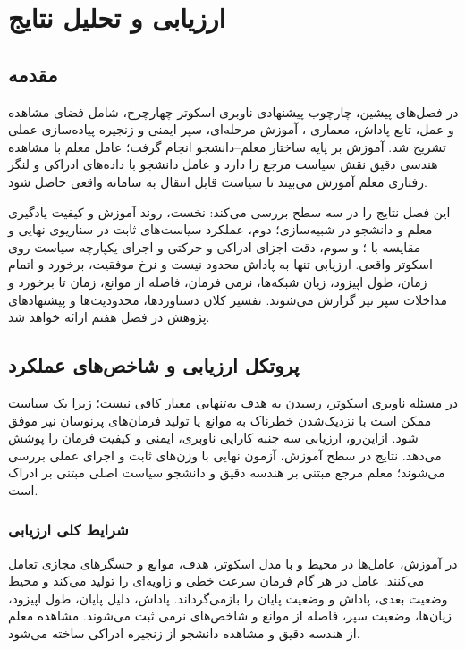 \chapter{ارزیابی و تحلیل نتایج}

\section{مقدمه}
\label{sec:evaluation_intro}

در فصل‌های پیشین، چارچوب پیشنهادی ناوبری اسکوتر چهارچرخ، شامل فضای مشاهده و عمل، تابع پاداش، معماری ، آموزش مرحله‌ای، سپر ایمنی و زنجیره پیاده‌سازی عملی تشریح شد. آموزش بر پایه ساختار معلم--دانشجو انجام گرفت؛ عامل معلم با مشاهده هندسی دقیق نقش سیاست مرجع را دارد و عامل دانشجو با داده‌های ادراکی و لنگر رفتاری معلم آموزش می‌بیند تا سیاست قابل انتقال به سامانه واقعی حاصل شود.

این فصل نتایج را در سه سطح بررسی می‌کند: نخست، روند آموزش و کیفیت یادگیری معلم و دانشجو در شبیه‌سازی؛ دوم، عملکرد سیاست‌های ثابت در سناریوی نهایی و مقایسه با ؛ و سوم، دقت اجزای ادراکی و حرکتی و اجرای یکپارچه سیاست روی اسکوتر واقعی. ارزیابی تنها به پاداش محدود نیست و نرخ موفقیت، برخورد و اتمام زمان، طول اپیزود، زیان شبکه‌ها، نرمی فرمان، فاصله از موانع، زمان تا برخورد و مداخلات سپر نیز گزارش می‌شوند. تفسیر کلان دستاوردها، محدودیت‌ها و پیشنهادهای پژوهش در فصل هفتم ارائه خواهد شد.

\section{پروتکل ارزیابی و شاخص‌های عملکرد}
\label{sec:evaluation_protocol}

در مسئله ناوبری اسکوتر، رسیدن به هدف به‌تنهایی معیار کافی نیست؛ زیرا یک سیاست ممکن است با نزدیک‌شدن خطرناک به موانع یا تولید فرمان‌های پرنوسان نیز موفق شود. ازاین‌رو، ارزیابی سه جنبه کارایی ناوبری، ایمنی و کیفیت فرمان را پوشش می‌دهد. نتایج در سطح آموزش، آزمون نهایی با وزن‌های ثابت و اجرای عملی بررسی می‌شوند؛ معلم مرجع مبتنی بر هندسه دقیق و دانشجو سیاست اصلی مبتنی بر ادراک است.

\subsection{شرایط کلی ارزیابی}
\label{subsec:evaluation_conditions}

در آموزش، عامل‌ها در محیط  و  با مدل اسکوتر، هدف، موانع و حسگرهای مجازی تعامل می‌کنند. عامل در هر گام فرمان سرعت خطی و زاویه‌ای را تولید می‌کند و محیط وضعیت بعدی، پاداش و وضعیت پایان را بازمی‌گرداند. پاداش، دلیل پایان، طول اپیزود، زیان‌ها، وضعیت سپر، فاصله از موانع و شاخص‌های نرمی ثبت می‌شوند. مشاهده معلم از هندسه دقیق و مشاهده دانشجو از زنجیره ادراکی ساخته می‌شود.

